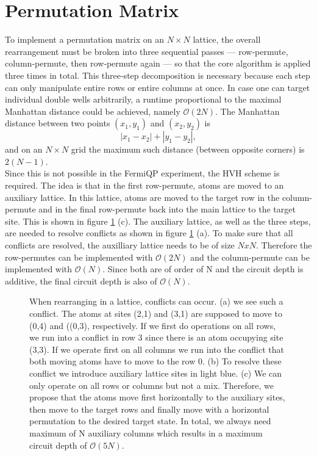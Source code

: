 \section{Permutation Matrix}
To implement a permutation matrix on an \(N\times N\) lattice, the overall rearrangement must be broken into three sequential passes — row‐permute, column‐permute, then row‐permute again — so that the core algorithm is applied three times in total. This three‐step decomposition is necessary because each step can only manipulate entire rows or entire columns at once.  In case one can target individual double wells arbitrarily, a runtime proportional to the maximal Manhattan distance could be achieved, namely \(\mathcal{O}(2N)\). The Manhattan distance between two points $(x_1,y_1)$ and $(x_2,y_2)$ is
\[|x_1 - x_2| + |y_1 - y_2|,\]
and on an $N\times N$ grid the maximum such distance (between opposite corners) is $2(N - 1)$. \\
Since this is not possible in the FermiQP experiment, the HVH scheme is required. The idea is that in the first row-permute, atoms are moved to an auxiliary lattice. In this lattice, atoms are moved to the target row in the column-permute and in the final row-permute back into the main lattice to the target site. This is shown in figure \ref{fig:HVH} (c). The auxiliary lattice, as well as the three steps, are needed to resolve conflicts as shown in figure \ref{fig:HVH} (a). To make sure that all conflicts are resolved, the auxilliary lattice needs to be of size $NxN$. Therefore the row-permutes can be implemented with $\mathcal{O}(2N)$ and the column-permute can be implemented with $\mathcal{O}(N)$. Since both are of order of N and the circuit depth is additive, the final circuit depth is also of $\mathcal{O}(N)$.


\begin{figure}[t]
  \centering
  \caption[HVH Scheme]{When rearranging in a lattice, conflicts can occur. (a) we see such a conflict. The atoms at sites (2,1) and (3,1) are supposed to move to (0,4) and ((0,3), respectively. If we first do operations on all rows, we run into a conflict in row 3 since there is an atom occupying site (3,3). If we operate first on all columns we run into the conflict that both moving atoms have to move to the row 0. (b) To resolve these conflict we introduce auxiliary lattice sites in light blue. (c) We can only operate on all rows or columns but not a mix. Therefore, we propose that the atoms move first horizontally to the auxiliary sites, then move to the target rows and finally move with a horizontal permutation to the desired target state. In total, we always need maximum of N auxiliary columns which results in a maximum circuit depth of $\mathcal{O}(5N)$.}
  \label{fig:HVH}
\end{figure}

